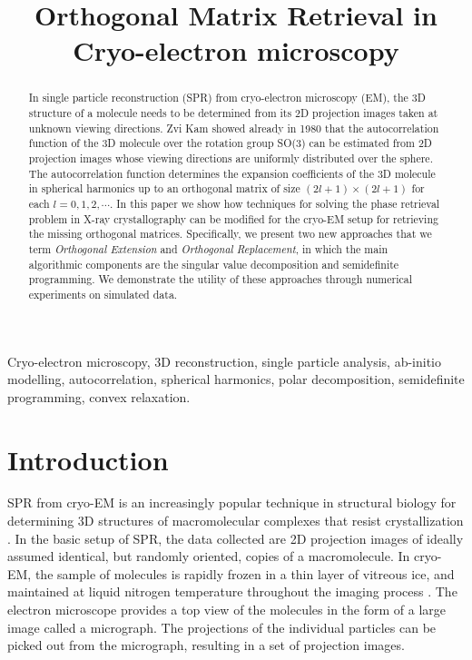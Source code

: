 \documentclass{article}
\title{Orthogonal Matrix Retrieval in Cryo-electron microscopy}
\begin{document}
%
\maketitle
%
\begin{abstract}
In single particle reconstruction (SPR) from cryo-electron microscopy (EM), the 3D structure of a molecule needs to be determined from its 2D projection images taken at unknown viewing directions. Zvi Kam showed already in 1980 that the autocorrelation function of the 3D molecule over the rotation group SO(3) can be estimated from 2D projection images whose viewing directions are uniformly distributed over the sphere. The autocorrelation function determines the expansion coefficients of the 3D molecule in spherical harmonics up to an orthogonal matrix of size $(2l+1)\times (2l+1)$ for each $l=0,1,2,\cdots$. In this paper we show how techniques for solving the phase retrieval problem in X-ray crystallography can be modified for the cryo-EM setup for retrieving the missing orthogonal matrices. Specifically, we present two new approaches that we term {\em Orthogonal Extension} and {\em Orthogonal Replacement}, in which the main algorithmic components are the singular value decomposition and semidefinite programming. We demonstrate the utility of these approaches through numerical experiments on simulated data.
\end{abstract}
%
\begin{keywords}
Cryo-electron microscopy, 3D reconstruction, single particle analysis, ab-initio modelling, autocorrelation, spherical harmonics, polar decomposition, semidefinite programming, convex relaxation.
\end{keywords}
%
\section{Introduction}
\label{sec:intro}

SPR from cryo-EM is an increasingly popular technique in structural biology for
determining 3D structures of macromolecular complexes that resist crystallization \cite{Frank1,resolution_revolution,Revol}.
In the basic setup of SPR, the data collected are 2D projection images of ideally assumed identical, but randomly oriented, copies of a macromolecule. In cryo-EM, the sample of molecules is rapidly frozen in a thin layer of vitreous ice, and maintained at liquid nitrogen temperature throughout the imaging process \cite{wang06}. The electron microscope provides a top view of the molecules in the form of a large image called a micrograph. The projections of the individual particles can be picked out from the micrograph, resulting in a set of projection images.
\end{document}
